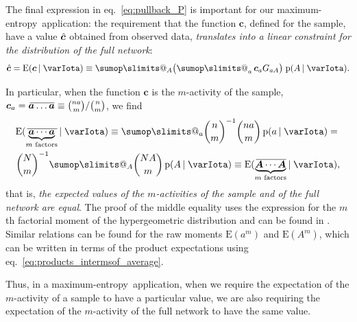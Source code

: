 \documentclass[\ifafour a4paper,12pt,\else a5paper,10pt,\fi%
onecolumn,oneside,article,%
british%
]{memoir}
\makeatletter
\theoremstyle{remark}
\theoremstyle{innote}
\def\sum{\DOTSI\sumop\slimits@}
\newcommand*{\pf}{\mathrm{p}}%
\newcommand*{\p}{\mathrm{P}}%
\newcommand*{\E}{\mathrm{E}}
\renewcommand*{\|}[1][]{\nonscript\,#1\vert\nonscript\;\mathopen{}}
\newcommand*{\eqn}{eq.}%
\newcommand*{\tsum}{\mathop{\textstyle\sum}\nolimits}
\newcommand*{\widebar}[1]{{\mkern1.5mu\skew{2}\overline{\mkern-1.5mu#1\mkern-1.5mu}\mkern 1.5mu}}
\newcommand*{\av}{\widebar} %
\newcommand*{\sav}{\widebar} %
\newcommand*{\ypp}{G}
\newcommand*{\yAv}{A}
\newcommand*{\yav}{a}
\newcommand*{\yNv}{N}
\newcommand*{\yaa}{\bm{\yav}}%
\newcommand*{\ya}{\yav}%
\newcommand*{\yAA}{\bm{\yAv}}%
\newcommand*{\yA}{\yAv}%
\newcommand*{\yH}{\varIota}
\newcommand*{\yg}{\bm{c}}
\newcommand*{\yc}{\Hat{\bm{c}}}
\newcommand*{\me}{maximum-entropy}
\makeatother
\begin{document}
\bigskip

The final expression in \eqn~\eqref{eq:pullback_P} is important for our
\me\ application: the requirement that the function $\yg$, defined for the
sample, have a  value $\yc$ obtained from observed data,
\emph{translates into a linear constraint for the distribution of the full
  network}:
\begin{equation}
  \label{eq:constraint_extended}
  \yc = \E(\yg \| \yH) \equiv \sum_{\yA} \bigl( \tsum_{\ya} \yg_{\ya}  \ypp_{\ya\yA} \bigr)\;
  \pf(\yA \| \yH).
\end{equation}

In particular, when the function $\yg$ is the $m$-activity of the sample,
$\yg_{\ya} = \sav{\yaa\dotso\yaa} \equiv \binom{n\ya}{m}/\binom{n}{m}$, we
find
\begin{multline}
  \label{eq:expe_products}
  \E(\sav{\underbrace{\yaa \dotsm \yaa}_{\text{$m$ factors}}} \| \yH)
\equiv
    \sum_{\ya} %
    \binom{n}{m}^{-1}
    \binom{n \ya}{m}\, \pf(\ya \| \yH)
    ={}\\
    \binom{\yNv}{m}^{-1}
    \sum_{\yA} %
    \binom{\yNv \yA}{m}\, \pf(\yA \| \yH)
\equiv    \E(\av{\underbrace{\yAA \dotsm \yAA}_{\text{$m$ factors}}} \| \yH),
\end{multline}
that is, \emph{the expected values of the $m$-activities of the sample and
  of the full network are equal}. The proof of the middle equality uses
the expression for the $m$th factorial moment of the hypergeometric
distribution and can be found in \textcite{potts1953}. Similar relations
can be found for the raw moments $\E(\ya^m)$ and $\E(\yA^m)$, which
can be written in terms of the product expectations using
\eqn~\eqref{eq:products_intermsof_average}.

Thus, in a \me\ application, when we require the expectation of the
$m$-activity of a sample to have a particular value, we are also
requiring  the expectation of the $m$-activity of the full network to
have the same value.
\end{document}
